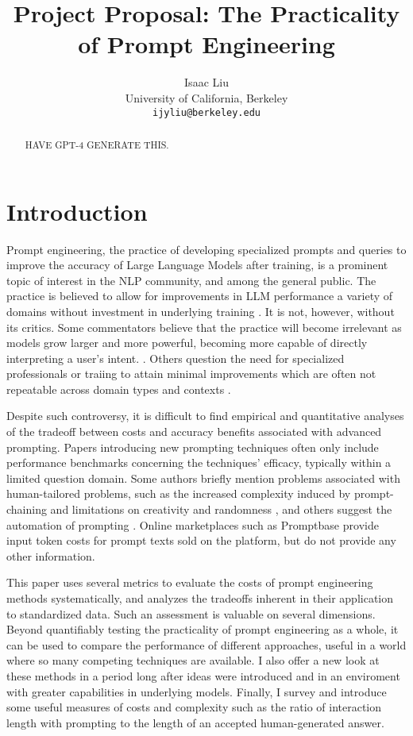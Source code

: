 \documentclass[11pt]{article}
\title{Project Proposal: The Practicality of Prompt Engineering}
\author{Isaac Liu \\
  University of California, Berkeley \\
  \texttt{ijyliu@berkeley.edu}}
\begin{document}
\maketitle
\begin{abstract}
HAVE GPT-4 GENERATE THIS.
\end{abstract}

\section*{Introduction}

Prompt engineering, the practice of developing specialized prompts and queries to improve the accuracy of Large Language Models after training, is a prominent topic of interest in the NLP community, and among the general public. The practice is believed to allow for improvements in LLM performance a variety of domains without investment in underlying training \cite{martineau_what_2021}. It is not, however, without its critics. Some commentators believe that the practice will become irrelevant as models grow larger and more powerful, becoming more capable of directly interpreting a user's intent. \cite{ethan_mollick_emollick_i_2023}. Others question the need for specialized professionals or traiing to attain minimal improvements which are often not repeatable across domain types and contexts \cite{shackell_prompt_2023, acar_ai_2023}. 

Despite such controversy, it is difficult to find empirical and quantitative analyses of the tradeoff between costs and accuracy benefits associated with advanced prompting. Papers introducing new prompting techniques often only include performance benchmarks concerning the techniques' efficacy, typically within a limited question domain. Some authors briefly mention problems associated with human-tailored problems, such as the increased complexity induced by prompt-chaining and limitations on creativity and randomness \cite{wu_ai_2022}, and others suggest the automation of prompting \cite{diao_active_2023}. Online marketplaces such as Promptbase \cite{noauthor_promptbase_nodate} provide input token costs for prompt texts sold on the platform, but do not provide any other information.

This paper uses several metrics to evaluate the costs of prompt engineering methods systematically, and analyzes the tradeoffs inherent in their application to standardized data. Such an assessment is valuable on several dimensions. Beyond quantifiably testing the practicality of prompt engineering as a whole, it can be used to compare the performance of different approaches, useful in a world where so many competing techniques are available. I also offer a new look at these methods in a period long after ideas were introduced and in an enviroment with greater capabilities in underlying models. Finally, I survey and introduce some useful measures of costs and complexity such as the ratio of interaction length with prompting to the length of an accepted human-generated answer.
\end{document}
